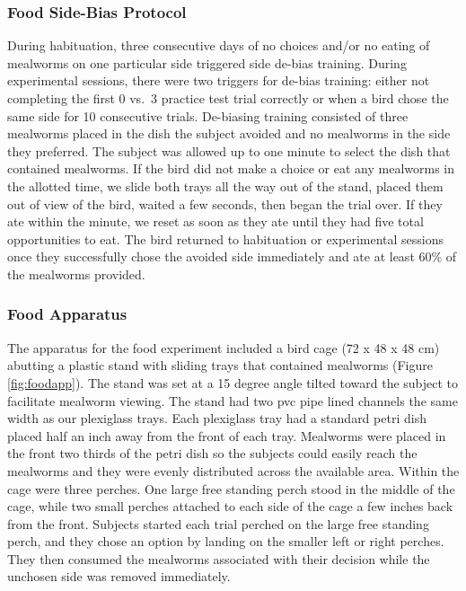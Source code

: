 \documentclass[
]{article}
\begin{document}
\hypertarget{food-side-bias-protocol}{%
\subsubsection{Food Side-Bias Protocol}\label{food-side-bias-protocol}}

During habituation, three consecutive days of no choices and/or no
eating of mealworms on one particular side triggered side de-bias
training. During experimental sessions, there were two triggers for
de-bias training: either not completing the first 0 vs.~3 practice test
trial correctly or when a bird chose the same side for 10 consecutive
trials. De-biasing training consisted of three mealworms placed in the
dish the subject avoided and no mealworms in the side they preferred.
The subject was allowed up to one minute to select the dish that
contained mealworms. If the bird did not make a choice or eat any
mealworms in the allotted time, we slide both trays all the way out of
the stand, placed them out of view of the bird, waited a few seconds,
then began the trial over. If they ate within the minute, we reset as
soon as they ate until they had five total opportunities to eat. The
bird returned to habituation or experimental sessions once they
successfully chose the avoided side immediately and ate at least 60\% of
the mealworms provided.

\hypertarget{food-apparatus}{%
\subsubsection{Food Apparatus}\label{food-apparatus}}

The apparatus for the food experiment included a bird cage (72 x 48 x 48
cm) abutting a plastic stand with sliding trays that contained mealworms
(Figure \ref{fig:foodapp}). The stand was set at a 15 degree angle
tilted toward the subject to facilitate mealworm viewing. The stand had
two pvc pipe lined channels the same width as our plexiglass trays. Each
plexiglass tray had a standard petri dish placed half an inch away from
the front of each tray. Mealworms were placed in the front two thirds of
the petri dish so the subjects could easily reach the mealworms and they
were evenly distributed across the available area. Within the cage were
three perches. One large free standing perch stood in the middle of the
cage, while two small perches attached to each side of the cage a few
inches back from the front. Subjects started each trial perched on the
large free standing perch, and they chose an option by landing on the
smaller left or right perches. They then consumed the mealworms
associated with their decision while the unchosen side was removed
immediately.
\end{document}
